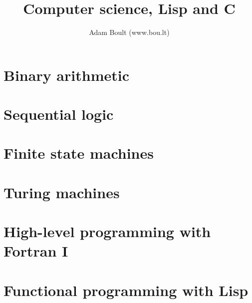 \documentclass[oneside]{book}
\begin{document}
\author{Adam Boult (www.bou.lt)}
\title{Computer science, Lisp and C}
\maketitle

\setcounter{tocdepth}{0}
\tableofcontents



\part{Binary arithmetic}




\part{Sequential logic}



\part{Finite state machines}



\part{Turing machines}












\part{High-level programming with Fortran I}




\part{Functional programming with Lisp}




\end{document}
